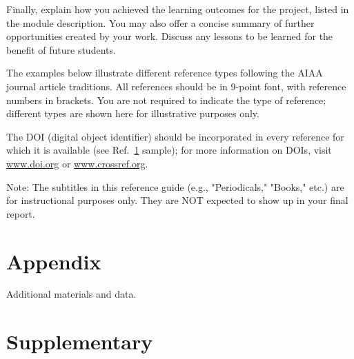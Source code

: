 \documentclass{engr1000j-s2}
\begin{document}
  Finally, explain how you achieved the learning outcomes for the project, listed in the module description. You may also offer a concise summary of further opportunities created by your work. Discuss any lessons to be learned for the benefit of future students.

  \hspace{1em}

  
  The examples below illustrate different reference types following the AIAA journal article traditions. All references should be in 9-point font, with reference numbers in brackets. You are not required to indicate the type of reference; different types are shown here for illustrative purposes only.

  The DOI (digital object identifier) should be incorporated in every reference for which it is available (see Ref.~\href{https://doi.org/10.1234/example.doi}{1} sample); for more information on DOIs, visit \href{https://www.doi.org}{www.doi.org} or \href{https://www.crossref.org}{www.crossref.org}.
  
  Note: The subtitles in this reference guide (e.g., "Periodicals," "Books," etc.) are for instructional purposes only. They are NOT expected to show up in your final report.



  \newpage
  \appendix
  \section{Appendix}
  Additional materials and data.

  \newpage
  \section{Supplementary}
\end{document}
